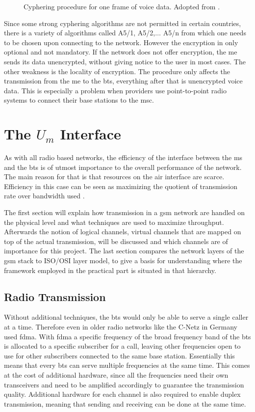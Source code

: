 \begin{figure}
\centering
\caption{Cyphering procedure for one frame of voice data. Adopted from \cite{kommsys2006}.}
\label{fig:cypher}
\end{figure}

Since some strong cyphering algorithms are not permitted in certain countries, there is a variety of algorithms called A5/1, A5/2,$\ldots$ A5/n from which one needs to be chosen upon connecting to the network.
However the encryption in only optional and not mandatory.
If the network does not offer encryption, the \gls{me} sends its data unencrypted, without giving notice to the user in most cases.
The other weakness is the locality of encryption.
The procedure only affects the transmission from the \gls{me} to the \gls{bts}, everything after that is unencrypted voice data.
This is especially a problem when providers use point-to-point radio systems to connect their base stations to the \gls{msc}.

\section{The $U_m$ Interface}
\label{sec:Um}
As with all radio based networks, the efficiency of the interface between the \gls{ms} and the \gls{bts} is of utmost importance to the overall performance of the network.
The main reason for that is that resources on the air interface are scarce.
Efficiency in this case can be seen as maximizing the quotient of transmission rate over bandwidth used \cite{protocols1999}.

The first section will explain how transmission in a \gls{gsm} network are handled on the physical level and what techniques are used to maximize throughput.
Afterwards the notion of logical channels, virtual channels that are mapped on top of the actual transmission, will be discussed and which channels are of importance for this project.
The last section compares the network layers of the \gls{gsm} stack to ISO/OSI layer model, to give a basis for understanding where the framework employed in the practical part is situated in that hierarchy.

\subsection{Radio Transmission}
\label{sec:radio}

Without additional techniques, the \gls{bts} would only be able to serve a single caller at a time. 
Therefore even in older radio networks like the C-Netz in Germany used \gls{fdma}.
With \gls{fdma} a specific frequency of the broad frequency band of the \gls{bts} is allocated to a specific subscriber for a call, leaving other frequencies open to use for other subscribers connected to the same base station.
Essentially this means that every \gls{bts} can serve multiple frequencies at the same time.
This comes at the cost of additional hardware, since all the frequencies need their own transceivers and need to be amplified accordingly to guarantee the transmission quality.
Additional hardware for each channel is also required to enable duplex transmission, meaning that sending and receiving can be done at the same time.


